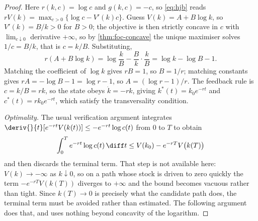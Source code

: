 \begin{proof}
	Here $r(k,c)=\log c$ and $g(k,c)=-c$, so \eqref{eq:hjb} reads
	$rV(k)=\max_{c>0}\{\log c-V'(k)c\}$. Guess $V(k)=A+B\log k$, so
	$V'(k)=B/k>0$ for $B>0$; the objective is then strictly concave in $c$ with
	$\lim_{c\downarrow0}$ derivative $+\infty$, so by \autoref{thm:foc-concave} the
	unique maximiser solves $1/c=B/k$, that is $c=k/B$. Substituting,
	\[
		r(A+B\log k)=\log\frac{k}{B}-\frac{B}{k}\cdot\frac{k}{B}
		=\log k-\log B-1 .
	\]
	Matching the coefficient of $\log k$ gives $rB=1$, so $B=1/r$; matching
	constants gives $rA=-\log B-1=\log r-1$, so $A=(\log r-1)/r$. The feedback rule
	is $c=k/B=rk$, so the state obeys $\dot k=-rk$, giving
	$k^{\ast}(t)=k_0e^{-rt}$ and $c^{\ast}(t)=rk_0e^{-rt}$, which satisfy the
	transversality condition.

	\emph{Optimality.} The usual verification argument integrates
	$\deriv{}{t}[e^{-rt}V(k(t))]\leq-e^{-rt}\log c(t)$ from $0$ to $T$ to obtain
	\[
		\int_0^{T}e^{-rt}\log c(t)\,\diff t\leq V(k_0)-e^{-rT}V\bigl(k(T)\bigr)
	\]
	and then discards the terminal term. That step is not available here:
	$V(k)\to-\infty$ as $k\downarrow0$, so on a path whose stock is driven to zero
	quickly the term $-e^{-rT}V(k(T))$ diverges to $+\infty$ and the bound becomes
	vacuous rather than tight. Since $k(T)\to0$ is precisely what the candidate path
	does, the terminal term must be avoided rather than estimated. The following
	argument does that, and uses nothing beyond concavity of the logarithm.


\end{proof}
